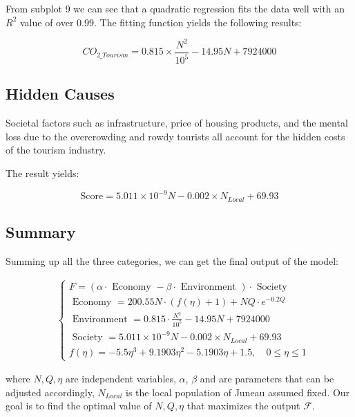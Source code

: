 \begin{figure}[H]
\begin{minipage}{0.33\textwidth}
    \end{minipage}
\end{figure}

From subplot 9 we can see that a quadratic regression 
fits the data well with an $R^2$ value of over 0.99.
The fitting function yields the following results:

\begin{equation}
    CO_{2\_Tourism} = 0.815 \times \frac{N^2}{10^5} - 14.95N+7924000
\end{equation}



\subsection{Hidden Causes}

Societal factors such as infrastructure, price of housing products, and the mental
loss due to the overcrowding and rowdy tourists all account for the hidden costs of the tourism industry.

The result yields:

\begin{equation}
    \text {Score}=5.011\times 10^{-9} N -0.002 \times N_{Local}+69.93
\end{equation}


\subsection{Summary}



Summing up all the three categories, we can get the final output of the model:

\begin{equation}
    \begin{aligned}
    &\left\{\begin{array}{l}
    F=(\alpha \cdot \text { Economy }-\beta \cdot \text { Environment }) \cdot \text { Society } \\[10pt]
    \text { Economy }=200.55 N \cdot(f(\eta)+1)+NQ\cdot e^{-0.2 Q} \\[10pt]
    \text { Environment }=0.815 \cdot \frac{N^2}{10^5}-14.95 N+7924000 \\[10pt]
    \text { Society }=5.011\times 10^{-9} N -0.002 \times N_{Local}+69.93 \\[10pt]
    f(\eta)=-5.5 \eta^3+9.1903 \eta^2-5.1903 \eta+1.5, \quad 0 \leq \eta \leq 1
    \end{array}\right.
    \end{aligned}
\end{equation}

where $N,Q,\eta$ are independent variables, $\alpha$, $\beta$ 
and are parameters that can be adjusted accordingly, 
$N_{Local}$ is the local population of Juneau assumed fixed.
Our goal is to find the optimal value of $N,Q,\eta$ that maximizes the output $\mathcal{F}$.